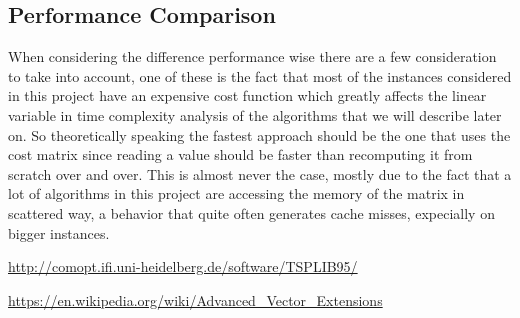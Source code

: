 \documentclass[a4paper]{article}
\begin{document}
\subsection[short]{Performance Comparison}

When considering the difference performance wise there are a few consideration to take into account, one of these is the fact that most of the instances considered in this project have an expensive cost function which greatly affects the linear variable in time complexity analysis of the algorithms that we will describe later on. So theoretically speaking the fastest approach should be the one that uses the cost matrix since reading a value should be faster than recomputing it from scratch over and over. This is almost never the case, mostly due to the fact that a lot of algorithms in this project are accessing the memory of the matrix in scattered way, a behavior that quite often generates cache misses, expecially on bigger instances.





\begin{thebibliography}{9}
	\url{http://comopt.ifi.uni-heidelberg.de/software/TSPLIB95/}

	\url{https://en.wikipedia.org/wiki/Advanced_Vector_Extensions}

\end{thebibliography}
\end{document}
